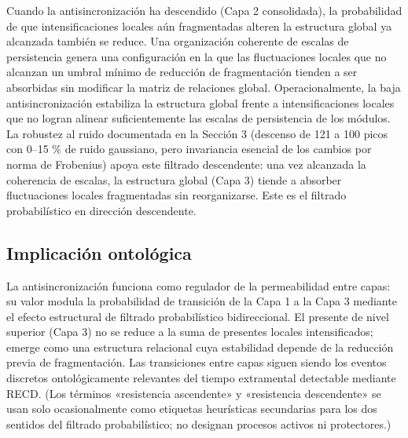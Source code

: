 Cuando la antisincronización ha descendido (Capa 2 consolidada), la probabilidad de que intensificaciones locales aún fragmentadas alteren la estructura global ya alcanzada también se reduce. Una organización coherente de escalas de persistencia genera una configuración en la que las fluctuaciones locales que no alcanzan un umbral mínimo de reducción de fragmentación tienden a ser absorbidas sin modificar la matriz de relaciones global. Operacionalmente, la baja antisincronización estabiliza la estructura global frente a intensificaciones locales que no logran alinear suficientemente las escalas de persistencia de los módulos. La robustez al ruido documentada en la Sección 3 (descenso de 121 a 100 picos con 0--15 \% de ruido gaussiano, pero invariancia esencial de los cambios por norma de Frobenius) apoya este filtrado descendente: una vez alcanzada la coherencia de escalas, la estructura global (Capa 3) tiende a absorber fluctuaciones locales fragmentadas sin reorganizarse. Este es el filtrado probabilístico en dirección descendente.

\subsection{Implicación ontológica}

La antisincronización funciona como regulador de la permeabilidad entre capas: su valor modula la probabilidad de transición de la Capa 1 a la Capa 3 mediante el efecto estructural de filtrado probabilístico bidireccional. El presente de nivel superior (Capa 3) no se reduce a la suma de presentes locales intensificados; emerge como una estructura relacional cuya estabilidad depende de la reducción previa de fragmentación. Las transiciones entre capas siguen siendo los eventos discretos ontológicamente relevantes del tiempo extramental detectable mediante RECD. (Los términos «resistencia ascendente» y «resistencia descendente» se usan solo ocasionalmente como etiquetas heurísticas secundarias para los dos sentidos del filtrado probabilístico; no designan procesos activos ni protectores.)